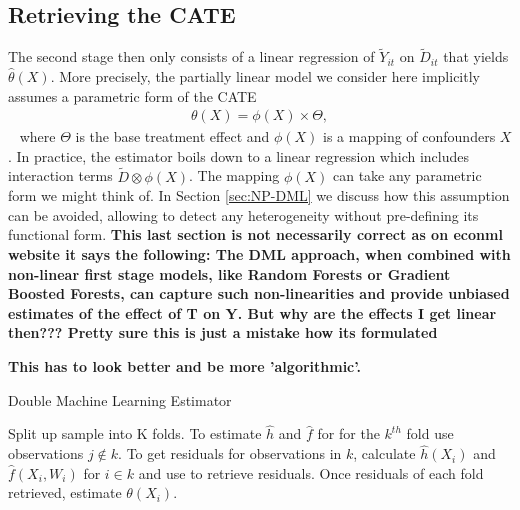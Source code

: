 \subsection{Retrieving the CATE}
The second stage then only consists of a linear regression of $\tilde{Y}_{it}$ on $\tilde{D}_{it}$ that yields $\hat{\theta}(X)$. More precisely, the partially linear model we consider here implicitly assumes a parametric form of the CATE 
\begin{align*} 
    \theta(X)=\phi(X) \times \Theta,
\end{align*} 
where $\Theta$ is the base treatment effect and $\phi(X)$ is a mapping of confounders $X$. In practice, the estimator boils down to a linear regression which includes interaction terms $\tilde{D} \otimes \phi(X)$. The mapping $\phi(X)$ can take any parametric form we might think of. In Section \ref{sec:NP-DML} we discuss how this assumption can be avoided, allowing to detect any heterogeneity without pre-defining its functional form. 
\textbf{This last section is not necessarily correct as on econml website it says the following: The DML approach, when combined with non-linear first stage models, like Random Forests or Gradient Boosted Forests, can capture such non-linearities and provide unbiased estimates of the effect of T on Y.
But why are the effects I get linear then??? Pretty sure this is just a mistake how its formulated}

\textbf{This has to look better and be more 'algorithmic'.}
\begin{algorithm}
    \caption{Double Machine Learning Estimator}
    \begin{algorithmic}[1]
        \State Split up sample into K folds. 
        \State To estimate $\widehat{h}$ and $\widehat{f}$ for for the $k^{th}$ fold use observations $j \notin k$. 
        \State To get residuals for observations in $k$, calculate $\widehat{h}(X_i)$ and $\widehat{f}(X_i, W_i)$ for $i \in k$ and use to retrieve residuals.
        \State Once residuals of each fold retrieved, estimate $\theta(X_i)$.
    \end{algorithmic}
\end{algorithm}

